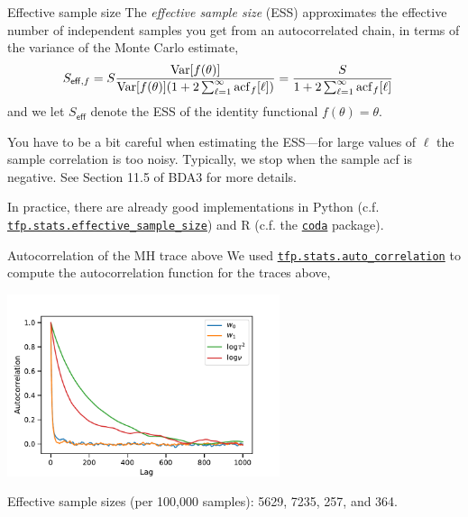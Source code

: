 \documentclass[aspectratio=169]{beamer}
\begin{document}
\begin{frame}{Effective sample size}
The \textit{effective sample size} (ESS) approximates the effective number of independent samples you get from an autocorrelated chain, in terms of the variance of the Monte Carlo estimate,
\begin{align}
    S_{\mathsf{eff},f} &= S \frac{\textrm{Var}[f(\theta)]}{\textrm{Var}[f(\theta)] ( 1 + 2 \sum_{\ell=1}^\infty \mathrm{acf}_f[\ell]) }
    =  \frac{S}{1 + 2 \sum_{\ell=1}^\infty \mathrm{acf}_f[\ell] }
\end{align}
and we let $S_{\mathsf{eff}}$ denote the ESS of the identity functional $f(\theta)= \theta$.

You have to be a bit careful when estimating the ESS---for large values of $\ell$ the sample correlation is too noisy. Typically, we stop when the sample acf is negative. See Section 11.5 of BDA3 for more details.

In practice, there are already good implementations in Python (c.f. \href{https://www.tensorflow.org/probability/api_docs/python/tfp/mcmc/effective_sample_size}{\texttt{tfp.stats.effective\_sample\_size}}) and R (c.f. the \href{https://cran.r-project.org/web/packages/coda/index.html}{\texttt{coda}} package). 
\end{frame}


\begin{frame}{Autocorrelation of the MH trace above}
    We used \href{https://www.tensorflow.org/probability/api_docs/python/tfp/stats/auto_correlation}{\texttt{tfp.stats.auto\_correlation}} to compute the autocorrelation function for the traces above,
    
    {\centering \includegraphics[width=0.6\textwidth]{figures/lap3/mh_autocorr.pdf}}
    
    Effective sample sizes (per 100,000 samples): 5629, 7235,  257, and 364.
\end{frame}
\end{document}
